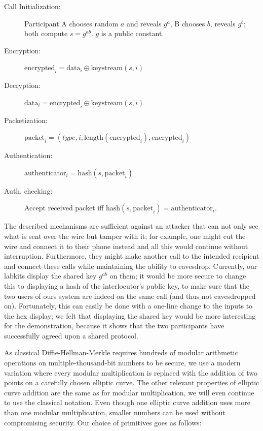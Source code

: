 \documentclass[a4paper]{report}
\begin{document}
\begin{description}
  \item[Call Initialization:] Participant A chooses random $a$ and reveals $g^a$,
	  B chooses $b$, reveals $g^b$; both compute $s=g^{ab}$. $g$ is a public constant.
  \item[Encryption:] $\text{encrypted}_i = \text{data}_i \mathbin{\oplus} \text{keystream}(s,i)$
  \item[Decryption:] $\text{data}_i = \text{encrypted}_i \mathbin{\oplus} \text{keystream}(s,i)$
  \item[Packetization:] $\text{packet}_i = \left(type, i, \text{length}(\text{encrypted}_i), \text{encrypted}_i\right)$
  \item[Authentication:] $\text{authenticator}_i = \text{hash}(s, \text{packet}_i)$
  \item[Auth. checking:] Accept received packet iff $\text{hash}(s, \text{packet}_i) = \text{authenticator}_i$.
\end{description}

The described mechanisms are sufficient against an attacker that can not only see
what is sent over the wire but tamper with it; for example, one might cut the
wire and connect it to their phone instead and all this would continue without
interruption. Furthermore, they might make another call to the intended
recipient and connect these calls while maintaining the ability to eavesdrop. Currently, our labkits display the shared key $g^{ab}$ on them; it would be more secure to change this to displaying a hash of the interlocutor's public key, to
make sure that the two users of ours system are indeed on the same call (and
thus not eavesdropped on). Fortunately, this can easily be done with a one-line change to the inputs to the hex display; we felt that displaying the shared key would be more interesting for the demonstration, because it shows that the two participants have successfully agreed upon a shared protocol. 

As classical Diffie-Hellman-Merkle requires hundreds of modular arithmetic operations
on multiple-thousand-bit numbers to be secure, we use a modern
variation where every modular multiplication is replaced with the addition of
two points on a carefully chosen elliptic curve. The other relevant properties
of elliptic curve addition are the same as for modular multiplication, we will %
even continue to use the classical notation. Even though one elliptic curve
addition uses more than one modular multiplication, smaller numbers can be used
without compromising security. Our choice of primitives goes as follows:
\end{document}
